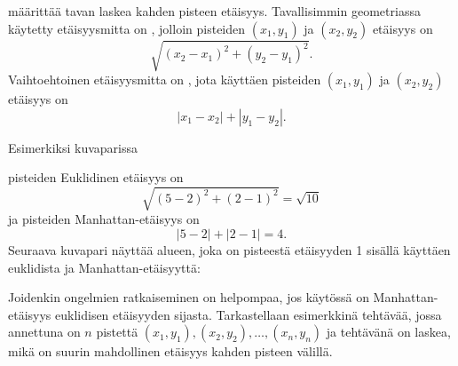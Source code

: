 määrittää tavan laskea kahden pisteen etäisyys.
Tavallisimmin geometriassa käytetty etäisyysmitta on
, jolloin pisteiden
$(x_1,y_1)$ ja $(x_2,y_2)$ etäisyys on
\[\sqrt{(x_2-x_1)^2+(y_2-y_1)^2}.\]
Vaihtoehtoinen etäisyysmitta on ,
jota käyttäen pisteiden
$(x_1,y_1)$ ja $(x_2,y_2)$ etäisyys on
\[|x_1-x_2|+|y_1-y_2|.\]
\begin{samepage}
Esimerkiksi kuvaparissa
\begin{center}
\end{center}
\end{samepage}
pisteiden Euklidinen etäisyys on
\[\sqrt{(5-2)^2+(2-1)^2}=\sqrt{10}\]
ja pisteiden Manhattan-etäisyys on
\[|5-2|+|2-1|=4.\]
Seuraava kuvapari näyttää alueen, joka on pisteestä etäisyyden 1
sisällä käyttäen euklidista ja Manhattan-etäisyyttä:
\begin{center}
\end{center}
Joidenkin ongelmien ratkaiseminen on helpompaa, jos käytössä on
Manhattan-etäisyys euklidisen etäisyyden sijasta.
Tarkastellaan esimerkkinä tehtävää, jossa annettuna
on $n$ pistettä $(x_1,y_1),(x_2,y_2),\ldots,(x_n,y_n)$
ja tehtävänä on laskea, mikä on suurin mahdollinen etäisyys
kahden pisteen välillä.

